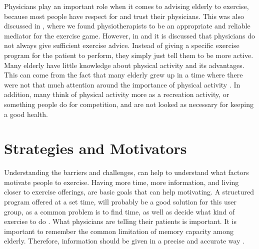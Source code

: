 Physicians play an important role when it comes to advising elderly to exercise, because most people have respect for and trust their physicians. This was also discussed in \cite{project}, where we found physiotherapists to be an appropriate and reliable mediator for the exercise game. However, in \cite{schutzer} and \cite{chao} it is discussed that physicians do not always give sufficient exercise advice. Instead of giving a specific exercise program for the patient to perform, they simply just tell them to be more active. Many elderly have little knowledge about physical activity and its advantages. This can come from the fact that many elderly grew up in a time where there were not that much attention around the importance of physical activity \cite{schutzer}. In addition, many think of physical activity more as a recreation activity, or something people do for competition, and are not looked as necessary for keeping a good health.  

\section{Strategies and Motivators}
\label{sec:motivators}
Understanding the barriers and challenges, can help to understand what factors motivate people to exercise. Having more time, more information, and living closer to exercise offerings, are basic goals that can help motivating.  A structured program offered at a set time, will probably be a good solution for this user group, as a common problem is to find time, as well as decide what kind of exercise to do \cite{chao}. What physicians are telling their patients is important. It is important to remember the common limitation of memory capacity among elderly. Therefore, information should be given in a precise and accurate way \cite{chao}.  

